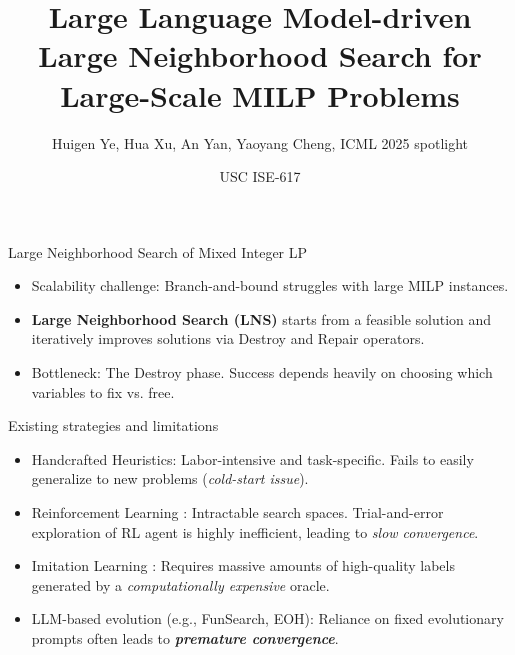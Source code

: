\documentclass{beamer}
\title[LLM-LNS for MILP]{Large Language Model-driven Large Neighborhood Search for Large-Scale MILP Problems}
\author[Jongmin Mun]{Huigen Ye, Hua Xu, An Yan, Yaoyang Cheng, ICML 2025 spotlight}
\institute[]{Presenter: Jongmin Mun}
\date{USC ISE-617}
\begin{document}
	
	\begin{frame}
		\titlepage
	\end{frame}
	
	\begin{frame}{Large Neighborhood Search of Mixed Integer LP}
		\begin{itemize}
			\item Scalability challenge: Branch-and-bound struggles with large MILP instances.
			\item \textbf{Large Neighborhood Search (LNS)}  starts from a feasible solution and iteratively improves solutions via Destroy and Repair operators.
			\item Bottleneck: The Destroy phase. Success depends heavily on choosing which variables to fix vs. free.	
\end{itemize}
	\end{frame}
	
	\begin{frame}{Existing strategies and limitations}
		
		\begin{itemize}
		\item Handcrafted Heuristics: Labor-intensive and task-specific. Fails to easily generalize to new problems (\emph{cold-start issue}).

\item Reinforcement Learning : Intractable search spaces. Trial-and-error exploration of RL agent is highly inefficient, leading to \emph{slow convergence}.

\item Imitation Learning  :  Requires massive amounts of high-quality labels generated by a \emph{computationally expensive}  oracle.

\item  LLM-based evolution (e.g., FunSearch, EOH):   Reliance on fixed evolutionary prompts often leads to \textbf{\emph{premature convergence}}. 
		\end{itemize}
	\end{frame}
\end{document}
